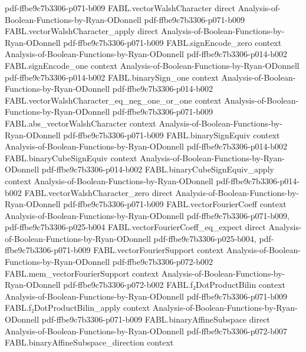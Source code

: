 \begin{theorem}
  {pdf-ffbe9c7b3306-p071-b009}
\proofstep
  {FABL.vectorWalshCharacter}
  {direct}
  {Analysis-of-Boolean-Functions-by-Ryan-ODonnell}
  {pdf-ffbe9c7b3306-p071-b009}
\proofstep
  {FABL.vectorWalshCharacter_apply}
  {direct}
  {Analysis-of-Boolean-Functions-by-Ryan-ODonnell}
  {pdf-ffbe9c7b3306-p071-b009}
\proofstep
  {FABL.signEncode_zero}
  {context}
  {Analysis-of-Boolean-Functions-by-Ryan-ODonnell}
  {pdf-ffbe9c7b3306-p014-b002}
\proofstep
  {FABL.signEncode_one}
  {context}
  {Analysis-of-Boolean-Functions-by-Ryan-ODonnell}
  {pdf-ffbe9c7b3306-p014-b002}
\proofstep
  {FABL.binarySign_one}
  {context}
  {Analysis-of-Boolean-Functions-by-Ryan-ODonnell}
  {pdf-ffbe9c7b3306-p014-b002}
\proofstep
  {FABL.vectorWalshCharacter_eq_neg_one_or_one}
  {context}
  {Analysis-of-Boolean-Functions-by-Ryan-ODonnell}
  {pdf-ffbe9c7b3306-p071-b009}
\proofstep
  {FABL.abs_vectorWalshCharacter}
  {context}
  {Analysis-of-Boolean-Functions-by-Ryan-ODonnell}
  {pdf-ffbe9c7b3306-p071-b009}
\proofstep
  {FABL.binarySignEquiv}
  {context}
  {Analysis-of-Boolean-Functions-by-Ryan-ODonnell}
  {pdf-ffbe9c7b3306-p014-b002}
\proofstep
  {FABL.binaryCubeSignEquiv}
  {context}
  {Analysis-of-Boolean-Functions-by-Ryan-ODonnell}
  {pdf-ffbe9c7b3306-p014-b002}
\proofstep
  {FABL.binaryCubeSignEquiv_apply}
  {context}
  {Analysis-of-Boolean-Functions-by-Ryan-ODonnell}
  {pdf-ffbe9c7b3306-p014-b002}
\proofstep
  {FABL.vectorWalshCharacter_zero}
  {direct}
  {Analysis-of-Boolean-Functions-by-Ryan-ODonnell}
  {pdf-ffbe9c7b3306-p071-b009}
\proofstep
  {FABL.vectorFourierCoeff}
  {context}
  {Analysis-of-Boolean-Functions-by-Ryan-ODonnell}
  {pdf-ffbe9c7b3306-p071-b009,
    pdf-ffbe9c7b3306-p025-b004}
\proofstep
  {FABL.vectorFourierCoeff_eq_expect}
  {direct}
  {Analysis-of-Boolean-Functions-by-Ryan-ODonnell}
  {pdf-ffbe9c7b3306-p025-b004,
    pdf-ffbe9c7b3306-p071-b009}
\proofstep
  {FABL.vectorFourierSupport}
  {context}
  {Analysis-of-Boolean-Functions-by-Ryan-ODonnell}
  {pdf-ffbe9c7b3306-p072-b002}
\proofstep
  {FABL.mem_vectorFourierSupport}
  {context}
  {Analysis-of-Boolean-Functions-by-Ryan-ODonnell}
  {pdf-ffbe9c7b3306-p072-b002}
\proofstep
  {FABL.f₂DotProductBilin}
  {context}
  {Analysis-of-Boolean-Functions-by-Ryan-ODonnell}
  {pdf-ffbe9c7b3306-p071-b009}
\proofstep
  {FABL.f₂DotProductBilin_apply}
  {context}
  {Analysis-of-Boolean-Functions-by-Ryan-ODonnell}
  {pdf-ffbe9c7b3306-p071-b009}
\proofstep
  {FABL.binaryAffineSubspace}
  {direct}
  {Analysis-of-Boolean-Functions-by-Ryan-ODonnell}
  {pdf-ffbe9c7b3306-p072-b007}
\proofstep
  {FABL.binaryAffineSubspace_direction}
  {context}

\end{theorem}
